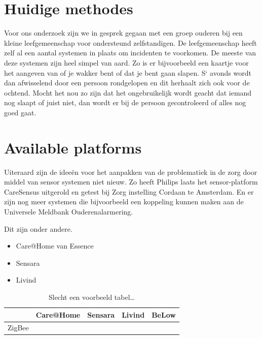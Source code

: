 \documentclass{below-ext}
\newcommand{\cmark}{\ding{51}}%
\newcommand{\xmark}{\ding{55}}%
\begin{document}
\section{Huidige methodes}
Voor ons onderzoek zijn we in gesprek gegaan met een groep ouderen bij een kleine leefgemeenschap voor ondersteund zelfstandigen. 
De leefgemeenschap heeft zelf al een aantal systemen in plaats om incidenten te voorkomen. De meeste van deze systemen zijn heel simpel van aard. Zo is er bijvoorbeeld een kaartje voor het aangeven van of je wakker bent of dat je bent gaan slapen. S` avonds wordt dan afwisselend door een persoon rondgelopen en dit herhaalt zich ook voor de ochtend. Mocht het nou zo zijn dat het ongebruikelijk wordt geacht dat iemand nog slaapt of juist niet, dan wordt er bij de persoon gecontroleerd of alles nog goed gaat.\cite{nivel}


\section{Available platforms}
Uiteraard zijn de ideeën voor het aanpakken van de problematiek in de zorg door middel van sensor systemen niet nieuw. Zo heeft Philips laats het sensor-platform CareSensus uitgerold en getest bij Zorg instelling Cordaan te Amsterdam.
En er zijn nog meer systemen die bijvoorbeeld een koppeling kunnen maken aan de Universele Meldbank Ouderenalarmering.

Dit zijn onder andere.
\begin{itemize}
\item Care@Home van Essence
\item Sensara
\item Livind
\end{itemize}

\begin{table}
\begin{tabular}{l|l|l|l|l}
& Care@Home & Sensara & Livind & BeLow \\
\hline
ZigBee & \cmark & \cmark & \cmark & \xmark \\
\end{tabular}
\caption{Slecht een voorbeeld tabel\ldots}
\end{table}
\end{document}
